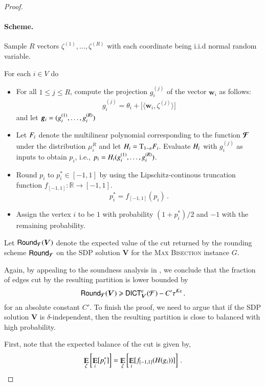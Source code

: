 \documentclass[11pt]{article}
\theoremstyle{definition}
\newenvironment{mybox}
{\center \noindent\begin{boxedminipage}{1.0\linewidth}}
{\end{boxedminipage}
\noindent
}
\newcommand{\iprod}[1]{\langle#1\rangle}
\newcommand{\Esymb}{\mathbb{E}}
\DeclareMathOperator*{\E}{\Esymb}
\renewcommand{\vec}[1]{{\bm{#1}}}
\newcommand{\mper}{\,.}
\newcommand{\R}{\mathbb R}
\newcommand{\problemmacro}[1]{\texorpdfstring{\textsc{#1}}{#1}\xspace}
\newcommand{\maxbisection}{\problemmacro{Max Bisection}}
\newcommand{\cF}{\mathcal F}
\renewcommand{\leq}{\leqslant}
\renewcommand{\geq}{\geqslant}
\let\epsilon=\varepsilon
\numberwithin{equation}{section}
\newcommand{\eps}{\epsilon}
\let\origparagraph\paragraph
\renewcommand{\paragraph}[1]{\origparagraph{#1.}}
\newcommand{\dict} {\textsf{DICT}}
\newcommand{\mrv}[1]{\bm{\lowercase{#1}}}
\newcommand{\mrf}[1]{\bm{\mathcal{\uppercase{#1}}}}
\newcommand{\opl}[1]{{\uppercase{#1}}}
\newcommand{\msf}[1]{\mathsf{#1}}
\newcommand{\round}{\msf{Round}}
\newcommand{\struncate}{f_{[-1,1]}}
\newcommand{\T}{\mathrm{T}}
\begin{document}
\begin{proof}
\begin{mybox}
\paragraph{Scheme}
	Sample $R$ vectors $\zeta^{(1)},\ldots,\zeta^{(R)}$ with each coordinate
      being i.i.d normal random variable.


      For each $i \in V$ do
      \begin{itemize}	
        \itemsep=0ex
      \item For all $1 \leq  j \leq R $,
        compute the projection $g_{i}^{(j)}$ of the vector
	$\vec w_i$ as follows:
        \begin{align*}
          {g}_{i}^{(j)}  = \theta_i +
          \Big[\iprod{\vec w_i ,
          \zeta^{(j)}}\Big] 	
        \end{align*}
	and let $\mrv{g}_i =  (g_i^{(1)},\ldots,g_i^{(R)})$



\item   Let $\opl{F}_i$ denote the multilinear polynomial
	corresponding to the function $\mrf{F}$ under the distribution
	$\mu_i^R$ and let $\opl{H}_i = \T_{1-\epsilon} \opl{F}_i$.
	Evaluate $\opl{H}_i$ with $g_{i}^{(j)}$ as
	inputs to obtain $p_i$, i.e., $p_i =
	\opl{H}_i(g_{i}^{(1)},\ldots,g_{i}^{(R)})$.
\item 	Round $p_i$ to $p_i^{*} \in
        [-1,1]$ by using the Lipschitz-continous truncation function
	$\struncate : \R \to [-1,1]$.
	$$ p_i^* = \struncate(p_i) \mper$$
\item   Assign the vertex $i$ to be $1$ with probability
	      $(1+p_i^{*})/2$ and $-1$ with the remaining probability.
      \end{itemize}
 \end{mybox}

  Let $\round_{\mrf{F}}(\vec V)$ denote the
  expected value of the cut returned by the rounding scheme
$\round_{\mrf{F}}$ on the SDP solution $\vec V$ for the
\maxbisection instance $G$.

Again, by appealing to the soundness analysis in \cite{Raghavendra08},
we conclude that the fraction of edges cut by the resulting partition
is lower bounded by
$$ \round_{\mrf{F}}(\vec V) \geq \dict_{\vec V}^{\eps}(\cF) -
C'\tau^{K\eps} \mper$$
for an absolute constant $C'$.  To finish the proof, we need to argue that if the SDP solution $\vec
V$ is $\delta$-independent, then the resulting partition is close to
balanced with high probability.

First, note that the expected balance of the cut is given by,
$$ \E_{\zeta} \left[ \E_{i}[ p_i^*] \right] =  \E_{\zeta} \left[
\E_{i}[\struncate(\opl{H}(g_{i})) ] \right] \mper $$


\end{proof}
\end{document}
